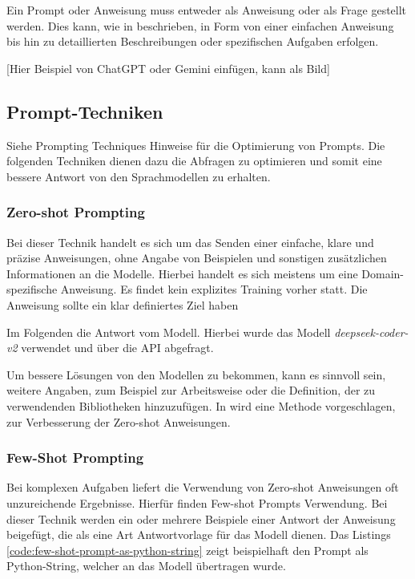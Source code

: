 Ein Prompt oder Anweisung muss entweder als Anweisung oder als Frage gestellt werden. Dies kann, wie in \cite{amatriain-2024} beschrieben, in Form von einer einfachen Anweisung bis hin zu detaillierten Beschreibungen oder spezifischen Aufgaben erfolgen.\vspace{0.2cm}

[Hier Beispiel von ChatGPT oder Gemini einfügen, kann als Bild]


\subsection{Prompt-Techniken}\label{subsec:prompt_technics}
Siehe Prompting Techniques Hinweise für die Optimierung von Prompts.
Die folgenden Techniken dienen dazu die Abfragen zu optimieren und somit eine bessere Antwort von den Sprachmodellen zu erhalten.


\subsubsection{Zero-shot Prompting}
Bei dieser Technik handelt es sich um das Senden einer einfache, klare und präzise Anweisungen, ohne Angabe von Beispielen und sonstigen zusätzlichen Informationen an die Modelle. Hierbei handelt es sich meistens um eine Domain-spezifische Anweisung. Es findet kein explizites Training vorher statt. Die Anweisung sollte ein klar definiertes Ziel haben\vspace{0.2cm}



Im Folgenden die Antwort vom Modell. Hierbei wurde das Modell \textit{deepseek-coder-v2} verwendet und über die API abgefragt.



Um bessere Lösungen von den Modellen zu bekommen, kann es sinnvoll sein, weitere Angaben, zum Beispiel zur Arbeitsweise oder die Definition, der zu verwendenden Bibliotheken hinzuzufügen. In \cite{wei-2021} wird eine Methode vorgeschlagen, zur Verbesserung der Zero-shot Anweisungen.


\subsubsection{Few-Shot Prompting}
Bei komplexen Aufgaben liefert die Verwendung von Zero-shot Anweisungen oft unzureichende Ergebnisse. Hierfür finden Few-shot Prompts Verwendung. Bei dieser Technik werden ein oder mehrere Beispiele einer Antwort der Anweisung beigefügt, die als eine Art Antwortvorlage für das Modell dienen. Das Listings \ref{code:few-shot-prompt-as-python-string} zeigt beispielhaft den Prompt als Python-String, welcher an das Modell übertragen wurde.\vspace{0.2cm}



